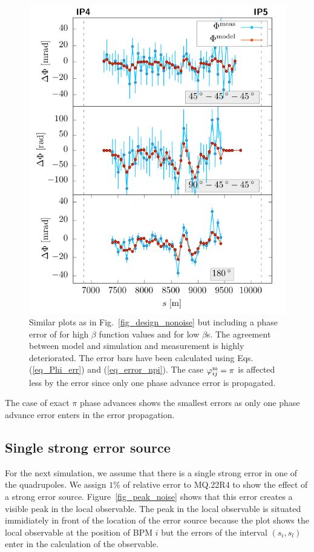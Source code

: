 \begin{figure}
  \centering
  \includegraphics[width=.6\linewidth]{sim_noise}
  \caption{
    Similar plots as in Fig.~\ref{fig_design_nonoise} but including a phase error of \noiserms{} for
    high $\beta$ function values and \highnoise{} for low $\beta$s.
    The agreement between model and simulation and measurement is highly deteriorated.
    The error bars have been calculated using Eqs. (\ref{eq_Phi_err}) and (\ref{eq_error_npi}).
    The case $\varphi_{ij}^\text{m}=\pi$ is affected less by the error since only one phase advance error
    is propagated.
  }
  \label{fig_design_noise}
\end{figure}

The case of exact $\pi$ phase advances shows the smallest errors as only one phase advance
error enters in the error propagation.

\subsection{Single strong error source}

For the next simulation, we assume that there is a single strong error in one of the quadrupoles. We
assign $1\%$ of relative error to MQ.22R4 to show the effect of a strong error source. Figure~\ref{fig_peak_noise}
shows that this error creates a visible peak in the local observable.
The peak in the local observable is situated immidiately in front of the location of the error source
because the plot shows the local observable at the position of BPM $i$ but the errors of the interval
$(s_i, s_l)$ enter in the calculation of the observable.

